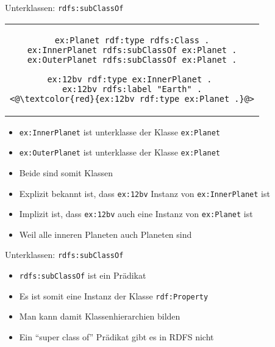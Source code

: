 \documentclass{beamer}
\begin{document}
\begin{frame}[fragile]{Unterklassen: \texttt{rdfs:subClassOf}}
	
	\begin{center}
		\begin{tabular}{c}
			\begin{lstlisting}
ex:Planet rdf:type rdfs:Class .
ex:InnerPlanet rdfs:subClassOf ex:Planet .
ex:OuterPlanet rdfs:subClassOf ex:Planet .

ex:12bv rdf:type ex:InnerPlanet . 
ex:12bv rdfs:label "Earth" .
<@\textcolor{red}{ex:12bv rdf:type ex:Planet .}@>
			\end{lstlisting}
		\end{tabular}
	\end{center}
	
	\begin{itemize}
		\item \texttt{ex:InnerPlanet} ist unterklasse der Klasse \texttt{ex:Planet}
		\item \texttt{ex:OuterPlanet} ist unterklasse der Klasse \texttt{ex:Planet}
		\item Beide sind somit Klassen
		\item Explizit bekannt ist, dass \texttt{ex:12bv} Instanz von \texttt{ex:InnerPlanet} ist
		\item Implizit ist, dass \texttt{ex:12bv} auch eine Instanz von \texttt{ex:Planet} ist
		\item Weil alle inneren Planeten auch Planeten sind
	\end{itemize}
	
\end{frame}

\begin{frame}{Unterklassen: \texttt{rdfs:subClassOf}}
	
	\begin{itemize}
		\item \texttt{rdfs:subClassOf} ist ein Prädikat
		\item Es ist somit eine Instanz der Klasse \texttt{rdf:Property}
		\item Man kann damit Klassenhierarchien bilden
		\item Ein ``super class of'' Prädikat gibt es in RDFS nicht
	\end{itemize}
	
\end{frame}
\end{document}
